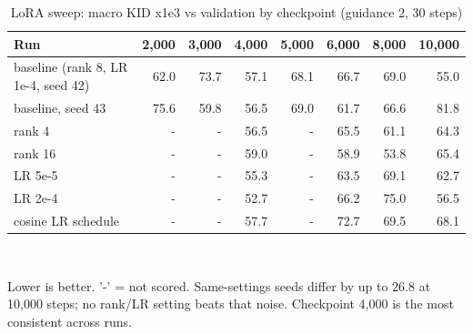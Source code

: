 \begin{table}[t]
\centering
\footnotesize
\caption{LoRA sweep: macro KID x1e3 vs validation by checkpoint (guidance 2, 30 steps)}
\label{tab:t04_lora_sweep}
\begin{tabular}{lrrrrrrr}
\toprule
Run & 2,000 & 3,000 & 4,000 & 5,000 & 6,000 & 8,000 & 10,000 \\
\midrule
baseline (rank 8, LR 1e-4, seed 42) & 62.0 & 73.7 & 57.1 & 68.1 & 66.7 & 69.0 & 55.0 \\
baseline, seed 43 & 75.6 & 59.8 & 56.5 & 69.0 & 61.7 & 66.6 & 81.8 \\
rank 4 & - & - & 56.5 & - & 65.5 & 61.1 & 64.3 \\
rank 16 & - & - & 59.0 & - & 58.9 & 53.8 & 65.4 \\
LR 5e-5 & - & - & 55.3 & - & 63.5 & 69.1 & 62.7 \\
LR 2e-4 & - & - & 52.7 & - & 66.2 & 75.0 & 56.5 \\
cosine LR schedule & - & - & 57.7 & - & 72.7 & 69.5 & 68.1 \\
\bottomrule
\end{tabular}
\\[2pt]\parbox{\linewidth}{\scriptsize Lower is better. '-' = not scored. Same-settings seeds differ by up to 26.8 at 10,000 steps; no rank/LR setting beats that noise. Checkpoint 4,000 is the most consistent across runs.}
\end{table}
